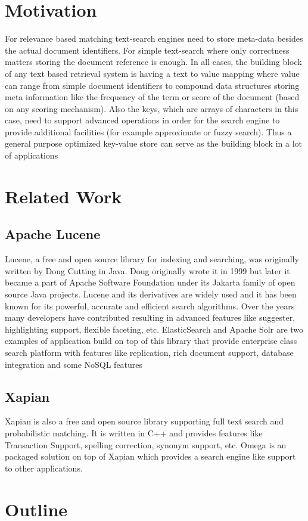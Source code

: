 \section{Motivation}
For relevance based matching text-search engines need to store meta-data besides the actual document identifiers.
For simple text-search where only correctness matters storing the document reference is enough.
In all cases, the building block of any text based retrieval system is having a text to value mapping where
value can range from simple document identifiers to compound data structures storing meta information like the frequency
of the term or score of the document (based on any scoring mechanism).
Also the keys, which are arrays of characters in this case, need to support advanced operations in order for
the search engine to provide additional facilities (for example approximate or fuzzy search).
Thus a general purpose optimized key-value store can serve as the building block in a lot of applications

\section{Related Work}

\subsection{Apache Lucene}
Lucene, a free and open source library for indexing and searching, was originally written by Doug Cutting\cite{goetz2000lucene}
in Java. Doug originally wrote it in 1999 but later it became a part of Apache Software Foundation under its Jakarta family
of open source Java projects.
Lucene and its derivatives are widely used and it has been known for its powerful, accurate and efficient search algorithms.
Over the years many developers have contributed resulting in advanced features like suggester, highlighting support, flexible faceting, etc.
ElasticSearch and Apache Solr are two examples of application build on top of this library that provide enterprise class search
platform with features like replication, rich document support, database integration and some NoSQL features

\subsection{Xapian}
Xapian is also a free and open source library supporting full text search and probabilistic matching.
It is written in C++ and provides features like Transaction Support, spelling correction, synonym support, etc.
Omega is an packaged solution on top of Xapian which provides a search engine like support to other applications.

\section{Outline}

